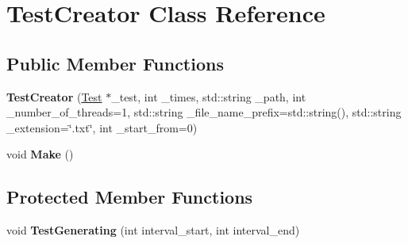 \hypertarget{class_test_creator}{}\section{Test\+Creator Class Reference}
\label{class_test_creator}
\subsection*{Public Member Functions}
\begin{DoxyCompactItemize}
\item 
\mbox{\label{class_test_creator_a42e7313422d75e9142bc8f53024c78e8}} 
{\bfseries Test\+Creator} (\hyperlink{class_test}{Test} $\ast$\+\_\+test, int \+\_\+times, std\+::string \+\_\+path, int \+\_\+number\+\_\+of\+\_\+threads=1, std\+::string \+\_\+file\+\_\+name\+\_\+prefix=std\+::string(), std\+::string \+\_\+extension=\char`\"{}.txt\char`\"{}, int \+\_\+start\+\_\+from=0)
\item 
\mbox{\label{class_test_creator_aca1be1f7abe92337cb78b9fcb39a7887}} 
void {\bfseries Make} ()
\end{DoxyCompactItemize}
\subsection*{Protected Member Functions}
\begin{DoxyCompactItemize}
\item 
\mbox{\label{class_test_creator_a7008308857ea20fca5f1178519a1ef62}} 
void {\bfseries Test\+Generating} (int interval\+\_\+start, int interval\+\_\+end)
\end{DoxyCompactItemize}
